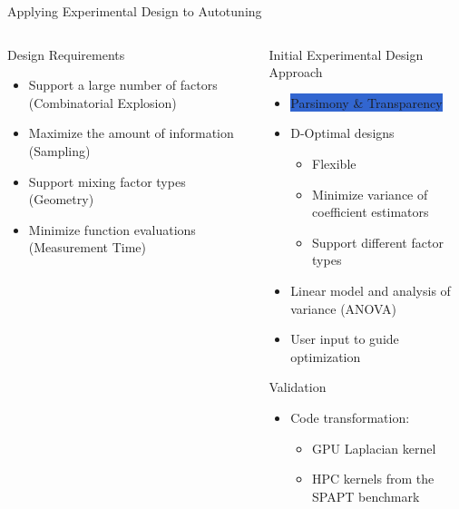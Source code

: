 \documentclass[10pt, compress, aspectratio=169, xcolor={table,usenames,dvipsnames}]{beamer}
\begin{document}
\begin{frame}[label={sec:org2d01443}]{Applying Experimental Design to Autotuning}
\begin{columns}
\begin{column}{0.45\columnwidth}
\begin{block}{Design Requirements}
\begin{itemize}
\item Support a large number of factors (\alert{Combinatorial Explosion})
\item Maximize the amount of information (\alert{Sampling})
\item Support mixing factor types (\alert{Geometry})
\item Minimize function evaluations (\alert{Measurement Time})
\end{itemize}
\end{block}
\end{column}

\begin{column}{0.55\columnwidth}
\begin{block}{Initial Experimental Design Approach}
\begin{itemize}
\item \colorbox{Highlight}{\alert{Parsimony} \& \alert{Transparency}}
\item \alert{D-Optimal} designs
\begin{itemize}
\item Flexible
\item Minimize variance of coefficient estimators
\item Support different factor types
\end{itemize}
\item \alert{Linear model} and analysis of variance (\alert{ANOVA})
\item User input to guide optimization
\end{itemize}

\begin{block}{Validation}
\begin{itemize}
\item Code transformation:
\begin{itemize}
\item GPU Laplacian kernel
\item HPC kernels from the SPAPT benchmark
\end{itemize}
\end{itemize}
\end{block}
\end{block}
\end{column}
\end{columns}
\end{frame}
\end{document}

